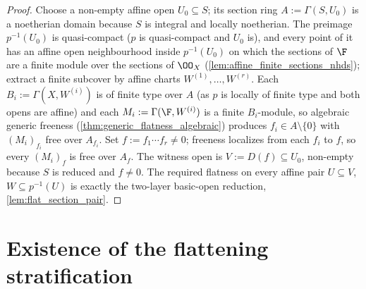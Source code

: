 \begin{proof}
  \leanok
  Choose a non-empty affine open \(U_0 \subseteq S\); its section ring
  \(A := \Gamma(S, U_0)\) is a noetherian domain because \(S\) is integral and
  locally noetherian. The preimage \(p^{-1}(U_0)\) is quasi-compact
  (\(p\) is quasi-compact and \(U_0\) is), and every point of it has an
  affine open neighbourhood inside \(p^{-1}(U_0)\) on which the sections of
  \(\F\) are a finite module over the sections of \(\OO_X\)
  (\cref{lem:affine_finite_sections_nhds}); extract a finite subcover by
  affine charts \(W^{(1)}, \dots, W^{(r)}\). Each
  \(B_i := \Gamma(X, W^{(i)})\) is of finite type over \(A\) (as \(p\) is
  locally of finite type and both opens are affine) and each
  \(M_i := \Gamma(\F, W^{(i)})\) is a finite \(B_i\)-module, so algebraic
  generic freeness (\cref{thm:generic_flatness_algebraic}) produces
  \(f_i \in A \setminus \{0\}\) with \((M_i)_{f_i}\) free over \(A_{f_i}\).
  Set \(f := f_1 \cdots f_r \ne 0\); freeness localizes from each \(f_i\) to
  \(f\), so every \((M_i)_f\) is free over \(A_f\). The witness open is
  \(V := D(f) \subseteq U_0\), non-empty because \(S\) is reduced and
  \(f \ne 0\). The required flatness on every affine pair
  \(U \subseteq V\), \(W \subseteq p^{-1}(U)\) is exactly the two-layer
  basic-open reduction, \cref{lem:flat_section_pair}.
\end{proof}

\section{Existence of the flattening stratification}
\label{sec:flatstrat_exists}

